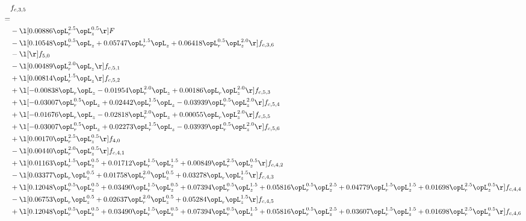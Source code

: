 \begin{alignat}{2} 
\label{eq:f_35_2} 
& f_{c,3,5} \nonumber \\ 
 = \\ 
& - \l[  0.00886 \opL_r^{2.5} \opL_z^{0.5}  \r] F \nonumber \\ 
& - \l[  0.10548 \opL_r^{0.5} \opL_z +  0.05747 \opL_r^{1.5} \opL_z +  0.06418 \opL_r^{0.5} \opL_z^{2.0}  \r] f_{c,3,6} \nonumber \\ 
& - \l[  \r] f_{5,0} \nonumber \\ 
& - \l[  0.00489 \opL_r^{2.0} \opL_z  \r] f_{c,5,1} \nonumber \\ 
& + \l[  0.00814 \opL_r^{1.5} \opL_z  \r] f_{c,5,2} \nonumber \\ 
& + \l[  -0.00838 \opL_r \opL_z   -0.01954 \opL_r^{2.0} \opL_z +  0.00186 \opL_r \opL_z^{2.0}  \r] f_{c,5,3} \nonumber \\ 
& + \l[  -0.03007 \opL_r^{0.5} \opL_z +  0.02442 \opL_r^{1.5} \opL_z   -0.03939 \opL_r^{0.5} \opL_z^{2.0}  \r] f_{c,5,4} \nonumber \\ 
& + \l[  -0.01676 \opL_r \opL_z   -0.02818 \opL_r^{2.0} \opL_z +  0.00055 \opL_r \opL_z^{2.0}  \r] f_{c,5,5} \nonumber \\ 
& + \l[  -0.03007 \opL_r^{0.5} \opL_z +  0.02273 \opL_r^{1.5} \opL_z   -0.03939 \opL_r^{0.5} \opL_z^{2.0}  \r] f_{c,5,6} \nonumber \\ 
& + \l[  0.00170 \opL_r^{2.5} \opL_z^{0.5}  \r] f_{4,0} \nonumber \\ 
& - \l[  0.00440 \opL_r^{2.0} \opL_z^{0.5}  \r] f_{c,4,1} \nonumber \\ 
& + \l[  0.01163 \opL_r^{1.5} \opL_z^{0.5} +  0.01712 \opL_r^{1.5} \opL_z^{1.5} +  0.00849 \opL_r^{2.5} \opL_z^{0.5}  \r] f_{c,4,2} \nonumber \\ 
& - \l[  0.03377 \opL_r \opL_z^{0.5} +  0.01758 \opL_r^{2.0} \opL_z^{0.5} +  0.03278 \opL_r \opL_z^{1.5}  \r] f_{c,4,3} \nonumber \\ 
& + \l[  0.12048 \opL_r^{0.5} \opL_z^{0.5} +  0.03490 \opL_r^{1.5} \opL_z^{0.5} +  0.07394 \opL_r^{0.5} \opL_z^{1.5} +  0.05816 \opL_r^{0.5} \opL_z^{2.5} +  0.04779 \opL_r^{1.5} \opL_z^{1.5} +  0.01698 \opL_r^{2.5} \opL_z^{0.5}  \r] f_{c,4,4} \nonumber \\ 
& - \l[  0.06753 \opL_r \opL_z^{0.5} +  0.02637 \opL_r^{2.0} \opL_z^{0.5} +  0.05284 \opL_r \opL_z^{1.5}  \r] f_{c,4,5} \nonumber \\ 
& + \l[  0.12048 \opL_r^{0.5} \opL_z^{0.5} +  0.03490 \opL_r^{1.5} \opL_z^{0.5} +  0.07394 \opL_r^{0.5} \opL_z^{1.5} +  0.05816 \opL_r^{0.5} \opL_z^{2.5} +  0.03607 \opL_r^{1.5} \opL_z^{1.5} +  0.01698 \opL_r^{2.5} \opL_z^{0.5}  \r] f_{c,4,6} \nonumber \\ 

\end{alignat}
